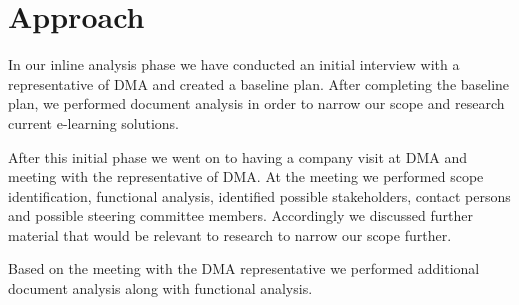 \section{Approach}
In our inline analysis phase we have conducted an initial interview with a representative of DMA and created a baseline plan. After completing the baseline plan, we performed document analysis in order to narrow our scope and research current e-learning solutions.

After this initial phase we went on to having a company visit at DMA and meeting with the representative of DMA. At the meeting we performed scope identification, functional analysis, identified possible stakeholders, contact persons and possible steering committee members. Accordingly we discussed further material that would be relevant to research to narrow our scope further.

Based on the meeting with the DMA representative we performed additional document analysis along with functional analysis.
